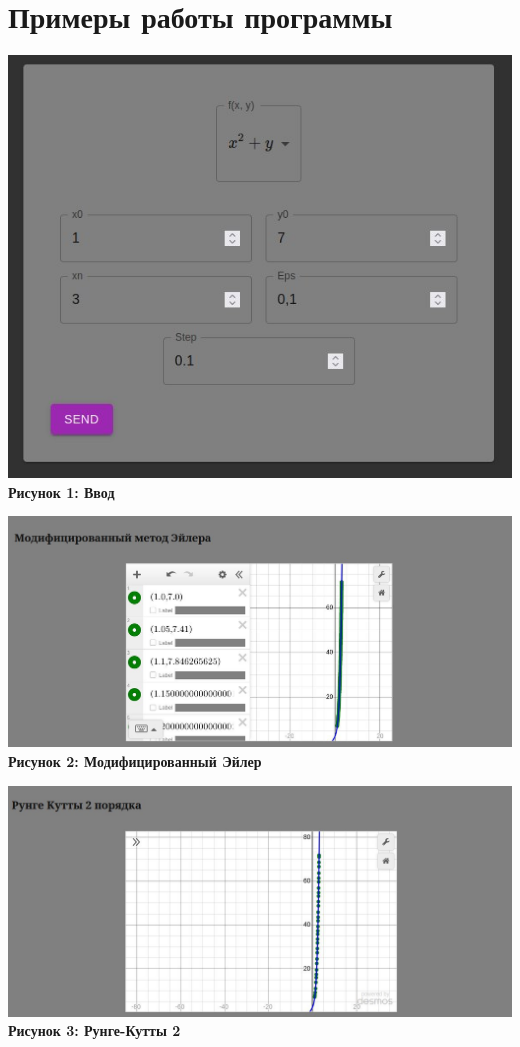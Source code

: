 \documentclass{article}
\begin{document}
\section{Примеры работы программы}

\begin{center}
    \includegraphics[width=.9\textwidth]{inp.jpg}\\
    \textbf{Рисунок 1: Ввод}
\end{center}

\begin{center}
    \includegraphics[width=.9\textwidth]{euler.jpg}\\
    \textbf{Рисунок 2: Модифицированный Эйлер}
\end{center}

\begin{center}
    \includegraphics[width=.9\textwidth]{rung.jpg}\\
    \textbf{Рисунок 3: Рунге-Кутты 2}
\end{center}
\end{document}
